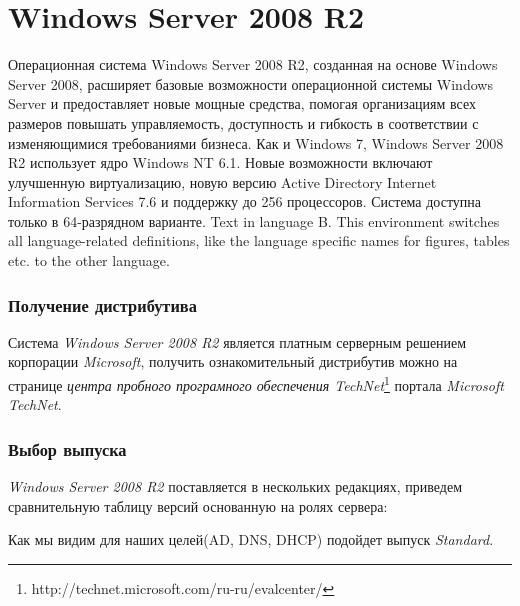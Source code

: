 \part{Windows Server 2008 R2}
\thispagestyle{plain}
Операционная система \foreignlanguage{english}{Windows Server 2008 R2}, созданная на основе \foreignlanguage{english}{Windows Server 2008}, расширяет базовые возможности операционной системы \foreignlanguage{english}{Windows Server} и предоставляет новые мощные средства, помогая организациям всех размеров повышать управляемость, доступность и гибкость в соответствии с изменяющимися требованиями бизнеса.
Как и Windows 7, Windows Server 2008 R2 использует ядро Windows NT 6.1.
Новые возможности включают улучшенную виртуализацию, новую версию \foreignlanguage{english}{Active Directory Internet Information Services 7.6} и поддержку до 256 процессоров. Система доступна только в 64-разрядном варианте.
\foreignlanguage{english}{Text in language B. This environment switches all language-related definitions, like the language specific names for figures, tables etc. to the other language.}

\section{Получение дистрибутива}
Система \textit{Windows Server 2008 R2} является платным серверным решением корпорации \textit{Microsoft}, получить ознакомительный дистрибутив можно на странице \textit{центра пробного програмного обеспечения TechNet}\footnote{http://technet.microsoft.com/ru-ru/evalcenter/} портала \textit{Microsoft TechNet}.

\section{Выбор выпуска}
\textit{Windows Server 2008 R2} поставляется в нескольких редакциях, приведем сравнительную таблицу версий основанную на ролях сервера:
\begin{figure}[H]
\end{figure}
Как мы видим для наших целей(AD, DNS, DHCP) подойдет выпуск \textit{Standard}.
\newpage
